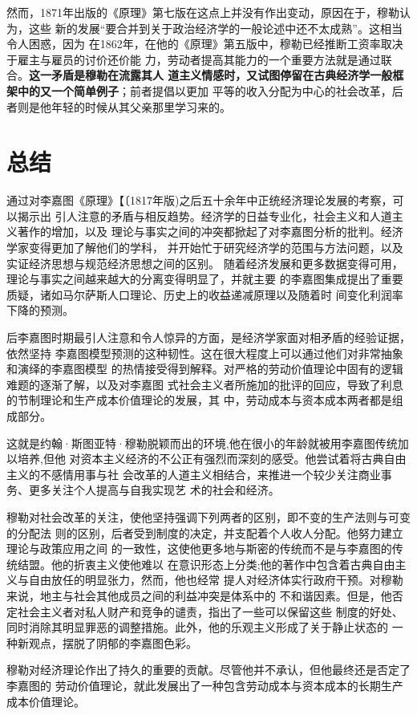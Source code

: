 然而，1871年出版的《原理》第七版在这点上并没有作出变动，原因在于，穆勒认为，这些
新的发展“要合并到关于政治经济学的一般论述中还不太成熟”。这相当令人困惑，因为
在1862年，在他的《原理》第五版中，穆勒已经推断工资率取决于雇主与雇员的讨价还价能
力，劳动者提高其能力的一个重要方法就是通过联合。\textbf{这一矛盾是穆勒在流露其人
  道主义情感时，又试图停留在古典经济学一般框架中的又一个简单例子}；前者提倡以更加
平等的收入分配为中心的社会改革，后者则是他年轻的时候从其父亲那里学习来的。

\section{总结}

通过对李嘉图《原理》【〔1817年版)之后五十余年中正统经济理论发展的考察，可以揭示出
引人注意的矛盾与相反趋势。经济学的日益专业化，社会主义和人道主义著作的增加，以及
理论与事实之间的冲突都掀起了对李嘉图分析的批判。经济学家变得更加了解他们的学科，
并开始忙于研究经济学的范围与方法问题，以及实证经济思想与规范经济思想之间的区别。
随着经济发展和更多数据变得可用，理论与事实之间越来越大的分离变得明显了，并就主要
的李嘉图集成提出了重要质疑，诸如马尔萨斯人口理论、历史上的收益递减原理以及随着时
间变化利润率下降的预测。

后李嘉图时期最引人注意和令人惊异的方面，是经济学家面对相矛盾的经验证据，依然坚持
李嘉图模型预测的这种韧性。这在很大程度上可以通过他们对非常抽象和演绎的李嘉图模型
的热情接受得到解释。对严格的劳动价值理论中固有的逻辑难题的逐渐了解，以及对李嘉图
式社会主义者所施加的批评的回应，导致了利息的节制理论和生产成本价值理论的发展，其
中，劳动成本与资本成本两者都是组成部分。

这就是约翰·斯图亚特·穆勒脱颖而出的环境,他在很小的年龄就被用李嘉图传统加以培养,但他
对资本主义经济的不公正有强烈而深刻的感受。他尝试着将古典自由主义的不感情用事与社
会改革的人道主义相结合，来推进一个较少关注商业事务、更多关注个人提高与自我实现艺
术的社会和经济。

穆勒对社会改革的关注，使他坚持强调下列两者的区别，即不变的生产法则与可变的分配法
则的区别，后者受到制度的决定，并支配着个人收人分配。他努力建立理论与政策应用之间
的一致性，这使他更多地与斯密的传统而不是与李嘉图的传统结盟。他的折衷主义使他难以
在意识形态上分类;他的著作中包含着古典自由主义与自由放任的明显张力，然而，他也经常
提人对经济体实行政府干预。对穆勒来说，地主与社会其他成员之间的利益冲突是体系中的
不和谐因素。但是，他否定社会主义者对私人财产和竞争的谴责，指出了一些可以保留这些
制度的好处、同时消除其明显罪恶的调整措施。此外，他的乐观主义形成了关于静止状态的
一种新观点，摆脱了阴郁的李嘉图色彩。

穆勒对经济理论作出了持久的重要的贡献。尽管他并不承认，但他最终还是否定了李嘉图的
劳动价值理论，就此发展出了一种包含劳动成本与资本成本的长期生产成本价值理论。



